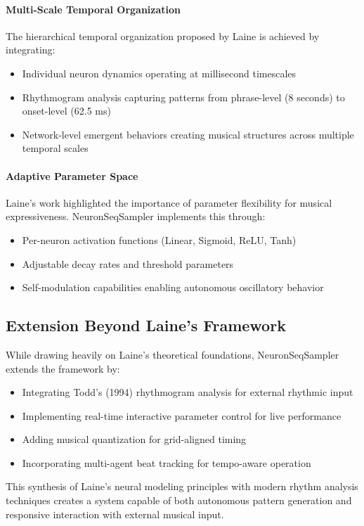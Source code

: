\documentclass[11pt,a4paper]{article}
\begin{document}
\paragraph{Multi-Scale Temporal Organization}
The hierarchical temporal organization proposed by Laine is achieved by integrating:
\begin{itemize}
\item Individual neuron dynamics operating at millisecond timescales
\item Rhythmogram analysis capturing patterns from phrase-level (8 seconds) to onset-level (62.5 ms)
\item Network-level emergent behaviors creating musical structures across multiple temporal scales
\end{itemize}

\paragraph{Adaptive Parameter Space}
Laine's work highlighted the importance of parameter flexibility for musical expressiveness. NeuronSeqSampler implements this through:
\begin{itemize}
\item Per-neuron activation functions (Linear, Sigmoid, ReLU, Tanh)
\item Adjustable decay rates and threshold parameters
\item Self-modulation capabilities enabling autonomous oscillatory behavior
\end{itemize}

\subsection{Extension Beyond Laine's Framework}

While drawing heavily on Laine's theoretical foundations, NeuronSeqSampler extends the framework by:
\begin{itemize}
\item Integrating Todd's (1994) rhythmogram analysis for external rhythmic input
\item Implementing real-time interactive parameter control for live performance
\item Adding musical quantization for grid-aligned timing
\item Incorporating multi-agent beat tracking for tempo-aware operation
\end{itemize}

This synthesis of Laine's neural modeling principles with modern rhythm analysis techniques creates a system capable of both autonomous pattern generation and responsive interaction with external musical input.
\end{document}

